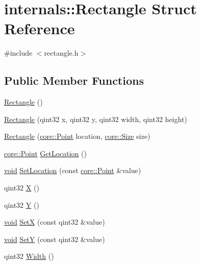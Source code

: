 \hypertarget{structinternals_1_1_rectangle}{\section{internals\-:\-:\-Rectangle \-Struct \-Reference}
\label{structinternals_1_1_rectangle}
}


{\ttfamily \#include $<$rectangle.\-h$>$}

\subsection*{\-Public \-Member \-Functions}
\begin{DoxyCompactItemize}
\item 
\hyperlink{group___o_p_map_widget_ga03611c46b536e7a99cbdbc186e3dff19}{\-Rectangle} ()
\item 
\hyperlink{group___o_p_map_widget_ga4c4f49dc7eb25d83f3289fe29b2b4cd1}{\-Rectangle} (qint32 x, qint32 y, qint32 width, qint32 height)
\item 
\hyperlink{group___o_p_map_widget_ga1d494138f0b6c0ba9d64a3b5dd0e076c}{\-Rectangle} (\hyperlink{structcore_1_1_point}{core\-::\-Point} location, \hyperlink{structcore_1_1_size}{core\-::\-Size} size)
\item 
\hyperlink{structcore_1_1_point}{core\-::\-Point} \hyperlink{group___o_p_map_widget_ga9dcbcbee1c0e91b3dfd3338a9a464d84}{\-Get\-Location} ()
\item 
\hyperlink{group___u_a_v_objects_plugin_ga444cf2ff3f0ecbe028adce838d373f5c}{void} \hyperlink{group___o_p_map_widget_ga7d71ff294aa5fdf0878e8c79a8b07725}{\-Set\-Location} (const \hyperlink{structcore_1_1_point}{core\-::\-Point} \&value)
\item 
qint32 \hyperlink{group___o_p_map_widget_ga95fc9b3e998dac5bc018066e5f59abf3}{\-X} ()
\item 
qint32 \hyperlink{group___o_p_map_widget_ga6ca37907a3c1adef88ec18719e426391}{\-Y} ()
\item 
\hyperlink{group___u_a_v_objects_plugin_ga444cf2ff3f0ecbe028adce838d373f5c}{void} \hyperlink{group___o_p_map_widget_ga22ba95479846a429af53aa19f149f5f3}{\-Set\-X} (const qint32 \&value)
\item 
\hyperlink{group___u_a_v_objects_plugin_ga444cf2ff3f0ecbe028adce838d373f5c}{void} \hyperlink{group___o_p_map_widget_gaea8a51114d79ece5fb59532867e15328}{\-Set\-Y} (const qint32 \&value)
\item 
qint32 \hyperlink{group___o_p_map_widget_ga1dcf3f71849a2534fe47d2db0fb5a317}{\-Width} ()

\end{DoxyCompactItemize}
